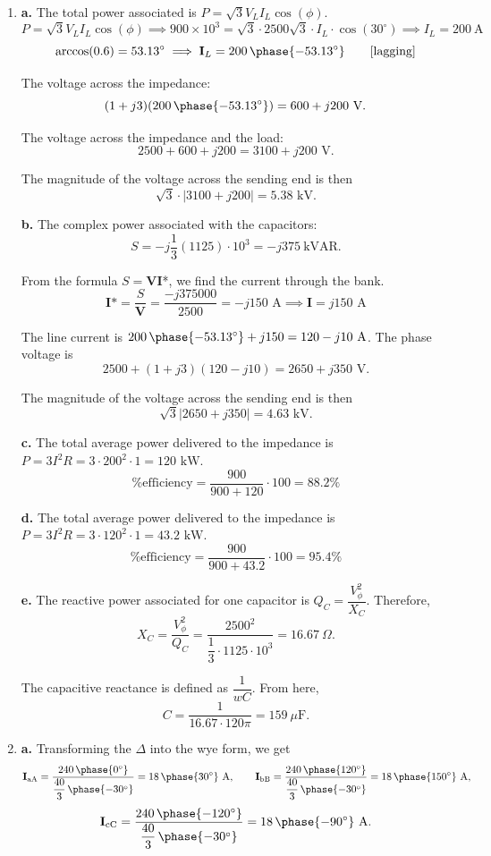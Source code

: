 \documentclass[11pt]{article}
\begin{document}
\begin{enumerate}[leftmargin=*,label=\textbf{\arabic*.}]
\item \textbf{a.} The total power associated is $P=\sqrt3V_{L}I_{L}\cos(\phi)$.
\[P=\sqrt3V_{L}I_{L}\cos(\phi)\implies900\times10^3=\sqrt3\cdot2500\sqrt3\cdot I_L\cdot\cos(30^\circ)\implies I_L=200\:\text{A}\]
\[\arccos(0.6)=53.13^\circ\implies\mathbf{I}_L=200\,\phase{-53.13^\circ}\qquad[\text{lagging}]\]

The voltage across the impedance:
\[(1+j3)(200\,\phase{-53.13^\circ})=600+j200\text{ V}.\]

The voltage across the impedance and the load:
\[2500+600+j200=3100+j200\text{ V}.\]

The magnitude of the voltage across the sending end is then
\[\sqrt3\cdot|3100+j200|=5.38\text{ kV}.\]

\textbf{b.} The complex power associated with the capacitors:
\[S=-j\frac13(1125)\cdot10^3=-j375\:\text{kVAR}.\]

From the formula $S=\mathbf{V}\mathbf{I}$*, we find the current through the bank.
\[\mathbf{I}\text{*}=\frac{S}{\mathbf{V}}=\frac{-j375000}{2500}=-j150\text{ A}\implies\mathbf{I}=j150\text{ A}\]

The line current is $200\,\phase{-53.13^\circ}+j150=120-j10\text{ A}$. The phase voltage is
\[2500+(1+j3)(120-j10)=2650+j350\text{ V}.\]

The magnitude of the voltage across the sending end is then
\[\sqrt3|2650+j350|=4.63\text{ kV}.\]

\textbf{c.} The total average power delivered to the impedance is $P=3I^2R=3\cdot200^2\cdot1=120\text{ kW}$.
\[\text{\% efficiency}=\frac{900}{900+120}\cdot100=88.2\%\]

\textbf{d.} The total average power delivered to the impedance is $P=3I^2R=3\cdot120^2\cdot1=43.2\text{ kW}$.
\[\text{\% efficiency}=\frac{900}{900+43.2}\cdot100=95.4\%\]

\textbf{e.} The reactive power associated for one capacitor is $Q_C=\dfrac{V_\phi^2}{X_C}$. Therefore,
\[X_C=\frac{V_\phi^2}{Q_C}=\frac{2500^2}{\dfrac13\cdot 1125\cdot10^3}=16.67\:\Omega.\]

The capacitive reactance is defined as $\dfrac1{wC}$. From here,
\[C=\frac1{16.67\cdot120\pi}=159\:\mu\text{F}.\]

\vspace{1em}

\item \textbf{a.} Transforming the $\Delta$ into the wye form, we get
\[\mathbf{I}_\text{aA}=\frac{240\,\phase{0^\circ}}{\dfrac{40}{3}\,\phase{-30^\circ}}=18\,\phase{30^\circ}\text{ A},\qquad\mathbf{I}_\text{bB}=\frac{240\,\phase{120^\circ}}{\dfrac{40}{3}\,\phase{-30^\circ}}=18\,\phase{150^\circ}\text{ A},\]
\[\mathbf{I}_\text{cC}=\frac{240\,\phase{-120^\circ}}{\dfrac{40}{3}\,\phase{-30^\circ}}=18\,\phase{-90^\circ}\text{ A}.\]


\end{enumerate}
\end{document}
